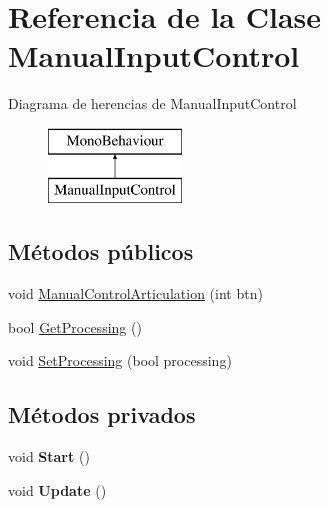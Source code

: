 \hypertarget{class_manual_input_control}{}\section{Referencia de la Clase Manual\+Input\+Control}
\label{class_manual_input_control}
Diagrama de herencias de Manual\+Input\+Control\begin{figure}[H]
\begin{center}
\leavevmode
\includegraphics[height=2.000000cm]{class_manual_input_control}
\end{center}
\end{figure}
\subsection*{Métodos públicos}
\begin{DoxyCompactItemize}
\item 
void \mbox{\hyperlink{class_manual_input_control_a1e39de6319d6aad69e82f083d6d42058}{Manual\+Control\+Articulation}} (int btn)
\item 
bool \mbox{\hyperlink{class_manual_input_control_a00de8f95d74cefb32806a4262fd90aba}{Get\+Processing}} ()
\item 
void \mbox{\hyperlink{class_manual_input_control_a8505abe190f5ce3a1a1b76d2e94e695f}{Set\+Processing}} (bool processing)
\end{DoxyCompactItemize}
\subsection*{Métodos privados}
\begin{DoxyCompactItemize}
\item 
\mbox{\label{class_manual_input_control_acc8776421340f27cc602a8b20dae4c3f}} 
void {\bfseries Start} ()
\item 
\mbox{\label{class_manual_input_control_a1f99322a0b2569fe0a38a8ffa594a7ac}} 
void {\bfseries Update} ()
\end{DoxyCompactItemize}

